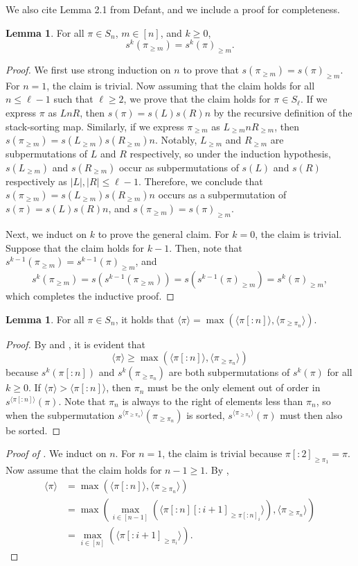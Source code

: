 \documentclass[12pt]{amsart}
\newcommand{\met}[1]{\langle #1\rangle}
\theoremstyle{definition}
\newtheorem{lemma}[theorem]{Lemma}
\begin{document}
We also cite Lemma 2.1 from Defant\cite{defant2}, and we include a proof for completeness.
\begin{lemma}\label{lem:gelastk}
For all $\pi\in S_n$, $m\in [n]$, and $k\ge 0$,
\[s^{k}(\pi_{\ge m})=s^k(\pi)_{\ge m}.\]
\end{lemma}
\begin{proof}
We first use strong induction on $n$ to prove that $s(\pi_{\ge m}) = s(\pi)_{\ge m}$. For $n=1$, the claim is trivial. Now assuming that the claim holds for all $n\le \ell - 1$ such that $\ell\ge 2$, we prove that the claim holds for $\pi\in S_\ell$. If we express $\pi$ as $LnR$, then $s(\pi)=s(L)s(R)n$ by the recursive definition of the stack-sorting map. Similarly, if we express $\pi_{\ge m}$ as $L_{\ge m}nR_{\ge m}$, then $s(\pi_{\ge m})=s(L_{\ge m})s(R_{\ge m})n.$ Notably, $L_{\ge m}$ and $R_{\ge m}$ are subpermutations of $L$ and $R$ respectively, so under the induction hypothesis, $s(L_{\ge m})$ and $s(R_{\ge m})$ occur as subpermutations of $s(L)$ and $s(R)$ respectively as $|L|, |R|\le \ell-1$. Therefore, we conclude that $s(\pi_{\ge m})=s(L_{\ge m})s(R_{\ge m})n$ occurs as a subpermutation of $s(\pi)=s(L)s(R)n$, and $s(\pi_{\ge m}) = s(\pi)_{\ge m}$.

Next, we induct on $k$ to prove the general claim. For $k=0$, the claim is trivial. Suppose that the claim holds for $k-1$. Then, note that $s^{k-1}(\pi_{\ge m}) = s^{k-1}(\pi)_{\ge m}$, and \[s^k(\pi_{\ge m})=s(s^{k-1}(\pi_{\ge m})) = s(s^{k-1}(\pi)_{\ge m}) = s^k(\pi)_{\ge m},\]
which completes the inductive proof.
\end{proof}
\begin{lemma}\label{lem:reduction}
For all $\pi\in S_n$, it holds that $\met{\pi}=\max(\met{\pi[:n]},\met{\pi_{\ge \pi_n}})$.
\end{lemma}
\begin{proof}
By  and , it is evident that \[\met{\pi}\ge\max(\met{\pi[:n]},\met{\pi_{\ge \pi_n}})\] because $s^k(\pi[:n])$ and $s^k(\pi_{\ge \pi_n})$ are both subpermutations of $s^k(\pi)$ for all $k\ge 0$. If $\met{\pi} > \met{\pi[:n]}$, then $\pi_n$ must be the only element out of order in $s^{\met{\pi[:n]}}(\pi)$. Note that $\pi_n$ is always to the right of elements less than $\pi_n$, so when the subpermutation $s^{\met{\pi_{\ge\pi_n}}}(\pi_{\ge \pi_n})$ is sorted, $s^{\met{\pi_{\ge\pi_n}}}(\pi)$ must then also be sorted.
\end{proof}
\begin{proof}[Proof of ]
We induct on $n$. For $n=1$, the claim is trivial because $\pi[:2]_{\ge \pi_1}=\pi$. Now assume that the claim holds for $n-1\ge 1$. By ,
\begin{align*}
\met{\pi}&=\max(\met{\pi[:n]},\met{\pi_{\ge \pi_n}}) \\
&=\max\left(\max_{i\in [n-1]}(\met{\pi[:n][:i+1]_{\ge \pi[:n]_i}}),\met{\pi_{\ge \pi_n}}\right) \\
&= \max_{i\in [n]}(\met{\pi[:i+1]_{\ge \pi_i}}).
\end{align*}
\end{proof}
\end{document}
